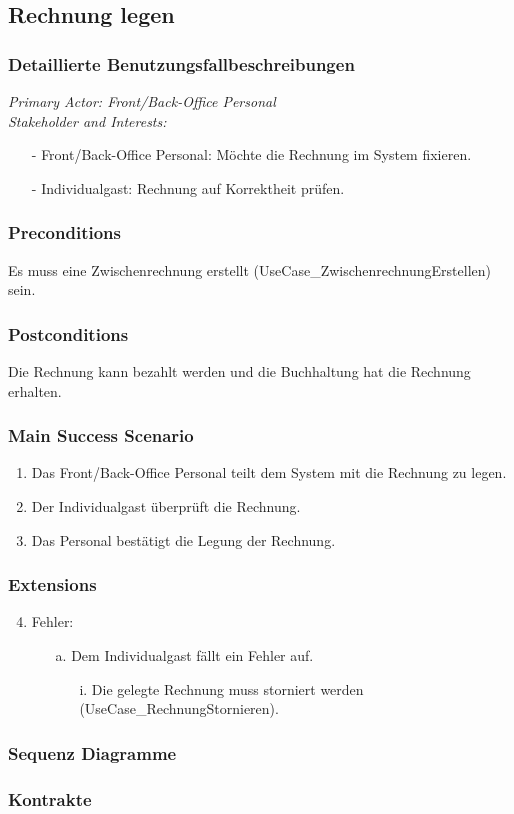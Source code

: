 \documentclass[./detailed_overview_usecases.tex]{subfiles}
\begin{document}
    \subsection{Rechnung legen}
    \subsubsection{Detaillierte Benutzungsfallbeschreibungen}
    \textit{Primary Actor: Front/Back-Office Personal}
    \\
    \textit{Stakeholder and Interests:}
    \begin{itemize}
        \item[-] Front/Back-Office Personal: Möchte die Rechnung im System fixieren.
		\item[-] Individualgast: Rechnung auf Korrektheit prüfen.
    \end{itemize}

    \subsubsection*{Preconditions}
    Es muss eine Zwischenrechnung erstellt (UseCase_ZwischenrechnungErstellen) sein.

    \subsubsection*{Postconditions}
    Die Rechnung kann bezahlt werden und die Buchhaltung hat die Rechnung erhalten.

    \subsubsection*{Main Success Scenario}
    \begin{enumerate}
        \item Das Front/Back-Office Personal teilt dem System mit die Rechnung zu legen.
        \item Der Individualgast überprüft die Rechnung.
        \item Das Personal bestätigt die Legung der Rechnung.
    \end{enumerate}

    \subsubsection*{Extensions}
    \begin{enumerate}
        \setcounter{enumi}{3}
        \item Fehler:
        \begin{itemize}
            \item[a.] Dem Individualgast fällt ein Fehler auf.
            \begin{itemize}
                \item[i.] Die gelegte Rechnung muss storniert werden (UseCase_RechnungStornieren).
            \end{itemize}
        \end{itemize}
    \end{enumerate}
    \subsubsection{Sequenz Diagramme}
    \subsubsection{Kontrakte}
\end{document}
